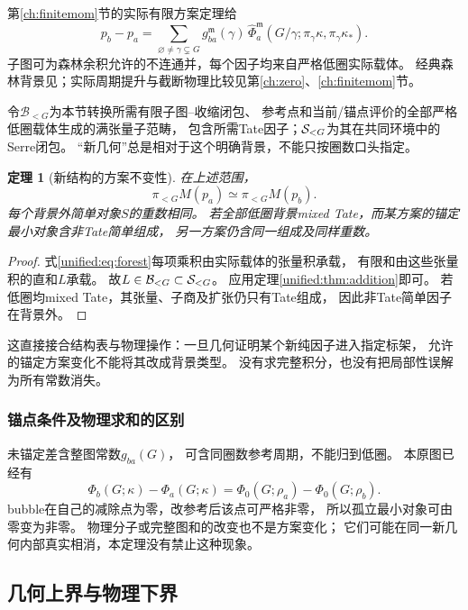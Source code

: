 \documentclass[11pt,a4paper,oneside]{ctexart}
\theoremstyle{cnplain}
\newtheorem{theorem}{定理}[section]
\theoremstyle{definition}
\theoremstyle{remark}
\numberwithin{equation}{section}
\begin{document}
第\ref{ch:finitemom}节的实际有限方案定理给
\begin{equation}\label{unified:eq:forest}
 p_b-p_a=\sum_{\varnothing\ne\gamma\subsetneq G}
 g_{ba}^{\mathfrak m}(\gamma)\,
 \widehat\Phi_a^{\mathfrak m}
 (G/\gamma;\pi_\gamma\kappa,\pi_\gamma\kappa_*).
\end{equation}
子图可为森林余积允许的不连通并，每个因子均来自严格低圈实际载体。
经典森林背景见\cite{bk2012}；实际周期提升与截断物理比较见第\ref{ch:zero}、\ref{ch:finitemom}节。

令$\mathcal B_{<G}$为本节转换所需有限子图--收缩闭包、
参考点和当前/锚点评价的全部严格低圈载体生成的满张量子范畴，
包含所需Tate因子；$\mathcal S_{<G}$为其在共同环境中的Serre闭包。
“新几何”总是相对于这个明确背景，不能只按圈数口头指定。

\begin{theorem}[新结构的方案不变性]\label{unified:thm:ren}
在上述范围，
\[
 \pi_{<G}M(p_a)\simeq\pi_{<G}M(p_b).
\]
每个背景外简单对象$S$的重数相同。
若全部低圈背景mixed Tate，而某方案的锚定最小对象含非Tate简单组成，
另一方案仍含同一组成及同样重数。
\end{theorem}
\begin{proof}
式\eqref{unified:eq:forest}每项乘积由实际载体的张量积承载，
有限和由这些张量积的直和$L$承载。
故$L\in\mathcal B_{<G}\subset\mathcal S_{<G}$。
应用定理\ref{unified:thm:addition}即可。
若低圈均mixed Tate，其张量、子商及扩张仍只有Tate组成，
因此非Tate简单因子在背景外。
\end{proof}

这直接接合结构表与物理操作：一旦几何证明某个新纯因子进入指定标架，
允许的锚定方案变化不能将其改成背景类型。
没有求完整积分，也没有把局部性误解为所有常数消失。

\subsubsection{锚点条件及物理求和的区别}
未锚定差含整图常数$g_{ba}(G)$，
可含同圈数参考周期，不能归到低圈。
本原图已经有
\[
 \Phi_b(G;\kappa)-\Phi_a(G;\kappa)
 =\Phi_0(G;\rho_a)-\Phi_0(G;\rho_b).
\]
bubble在自己的减除点为零，改参考后该点可严格非零，
所以孤立最小对象可由零变为非零。
物理分子或完整图和的改变也不是方案变化；
它们可能在同一新几何内部真实相消，本定理没有禁止这种现象。


\subsection{几何上界与物理下界}
\end{document}
